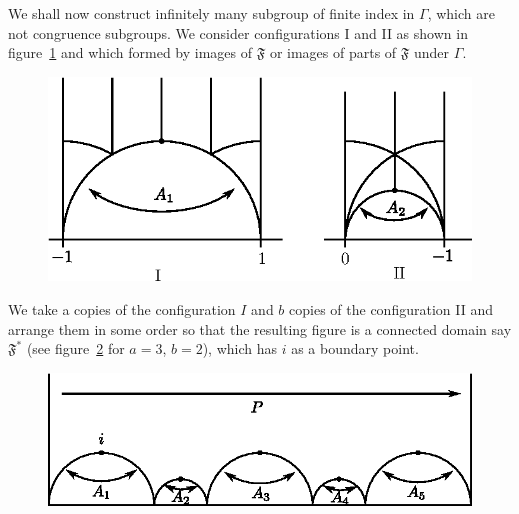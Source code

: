 We shall now construct infinitely many subgroup of finite index in
$\Gamma$, which are not congruence subgroups. We consider
configurations I and II as shown in figure~\ref{chap2:fig18} and which formed by
images of $\mathfrak{F}$ or images of parts of $\mathfrak{F}$ under
$\Gamma$.

\begin{figure}[H]
\centering
\includegraphics{vol29-fig/fig29-18.eps}
\smallskip
\caption{}
\label{chap2:fig18}
\end{figure}

We take a copies of the configuration $I$ and $b$ copies of the
configuration II and arrange them in some order so that the resulting
figure is a connected domain say $\mathfrak{F}^{\ast}$ (see figure~\ref{chap2:fig19}
for $a=3$, $b=2$), which has $i$ as a boundary point.

\begin{figure}[H]
\centering
\includegraphics{vol29-fig/fig29-19.eps}
\smallskip
\caption{}
\label{chap2:fig19}
\end{figure}\pageoriginale 

